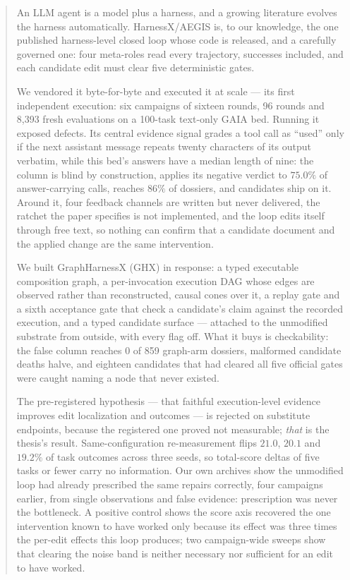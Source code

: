 \begin{abstract}
\singlespacing\noindent
An LLM agent is a model plus a harness, and a growing literature evolves
the harness automatically. HarnessX/AEGIS is, to our knowledge, the one
published harness-level closed loop whose code is released, and a
carefully governed one: four meta-roles read every trajectory, successes
included, and each candidate edit must clear five deterministic gates.

We vendored it byte-for-byte and executed it at scale --- its first
independent execution: six campaigns of sixteen rounds, 96 rounds and
8{,}393 fresh evaluations on a 100-task text-only GAIA bed. Running it
exposed defects. Its central evidence signal grades a tool
call as ``used'' only if the next assistant message repeats twenty
characters of its output verbatim, while this bed's answers have a median
length of nine: the column is blind by construction, applies its negative
verdict to $75.0\%$ of answer-carrying calls, reaches $86\%$ of dossiers,
and candidates ship on it. Around it, four feedback channels are written
but never delivered, the ratchet the paper specifies is not implemented,
and the loop edits itself through free text, so nothing can confirm that a
candidate document and the applied change are the same intervention.

We built GraphHarnessX (GHX) in response: a typed executable composition
graph, a per-invocation execution DAG whose edges are observed rather than
reconstructed, causal cones over it, a replay gate and a sixth acceptance
gate that check a candidate's claim against the recorded execution, and a
typed candidate surface --- attached to the unmodified
substrate from outside, with every flag off. What it buys is
checkability: the false column reaches 0 of 859 graph-arm dossiers,
malformed candidate deaths halve, and eighteen candidates that had cleared
all five official gates were caught naming a node that never existed.

The pre-registered hypothesis --- that faithful execution-level evidence
improves edit localization and outcomes --- is rejected on substitute
endpoints, because the registered one proved not measurable; \emph{that}
is the thesis's result. Same-configuration re-measurement flips $21.0$,
$20.1$ and $19.2\%$ of task outcomes across three seeds, so total-score
deltas of five tasks or fewer carry no information. Our own archives show
the unmodified loop had already prescribed the same repairs correctly,
four campaigns earlier, from single observations and false evidence:
prescription was never the bottleneck. A positive control shows the score
axis recovered the one intervention known to have worked only because
its effect was three times the per-edit effects this loop produces;
two campaign-wide sweeps show that clearing the noise band is neither
necessary nor sufficient for an edit to have worked.


\end{abstract}
